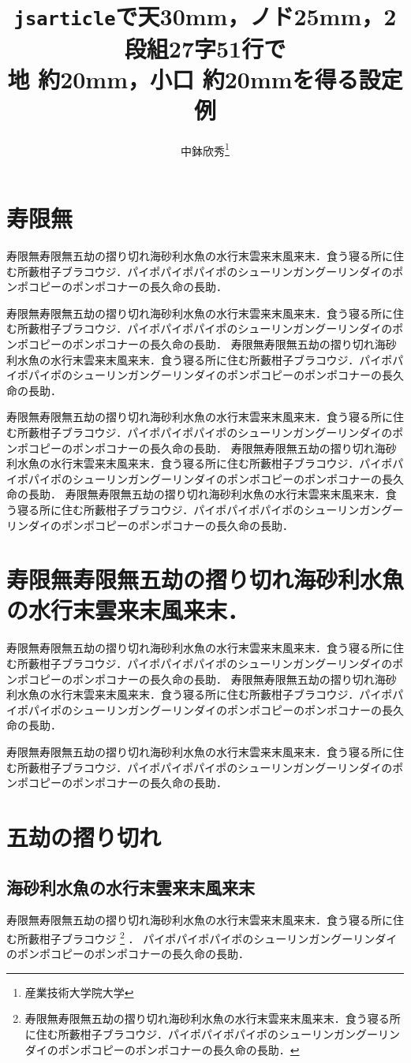 \documentclass[a4j, 9pt, twocolumn, twoside]{jsarticle}
\title{\texttt{jsarticle}で天30mm，ノド25mm，2段組27字51行で\\地 約20mm，小口 約20mmを得る設定例}
\author{中鉢欣秀\thanks{産業技術大学院大学}}
\begin{document}
\maketitle
\section{寿限無}
寿限無寿限無五劫の摺り切れ海砂利水魚の水行末雲来末風来末．食う寝る所に住む所藪柑子ブラコウジ．パイポパイポパイポのシューリンガングーリンダイのポンポコピーのポンポコナーの長久命の長助．

寿限無寿限無五劫の摺り切れ海砂利水魚の水行末雲来末風来末．食う寝る所に住む所藪柑子ブラコウジ．パイポパイポパイポのシューリンガングーリンダイのポンポコピーのポンポコナーの長久命の長助．
寿限無寿限無五劫の摺り切れ海砂利水魚の水行末雲来末風来末．食う寝る所に住む所藪柑子ブラコウジ．パイポパイポパイポのシューリンガングーリンダイのポンポコピーのポンポコナーの長久命の長助．

寿限無寿限無五劫の摺り切れ海砂利水魚の水行末雲来末風来末．食う寝る所に住む所藪柑子ブラコウジ．パイポパイポパイポのシューリンガングーリンダイのポンポコピーのポンポコナーの長久命の長助．
寿限無寿限無五劫の摺り切れ海砂利水魚の水行末雲来末風来末．食う寝る所に住む所藪柑子ブラコウジ．パイポパイポパイポのシューリンガングーリンダイのポンポコピーのポンポコナーの長久命の長助．
寿限無寿限無五劫の摺り切れ海砂利水魚の水行末雲来末風来末．食う寝る所に住む所藪柑子ブラコウジ．パイポパイポパイポのシューリンガングーリンダイのポンポコピーのポンポコナーの長久命の長助．
\section{寿限無寿限無五劫の摺り切れ海砂利水魚の水行末雲来末風来末．}
寿限無寿限無五劫の摺り切れ海砂利水魚の水行末雲来末風来末．食う寝る所に住む所藪柑子ブラコウジ．パイポパイポパイポのシューリンガングーリンダイのポンポコピーのポンポコナーの長久命の長助．
寿限無寿限無五劫の摺り切れ海砂利水魚の水行末雲来末風来末．食う寝る所に住む所藪柑子ブラコウジ．パイポパイポパイポのシューリンガングーリンダイのポンポコピーのポンポコナーの長久命の長助．

寿限無寿限無五劫の摺り切れ海砂利水魚の水行末雲来末風来末．食う寝る所に住む所藪柑子ブラコウジ．パイポパイポパイポのシューリンガングーリンダイのポンポコピーのポンポコナーの長久命の長助．
\section{五劫の摺り切れ}
\subsection{海砂利水魚の水行末雲来末風来末}
寿限無寿限無五劫の摺り切れ海砂利水魚の水行末雲来末風来末．食う寝る所に住む所藪柑子ブラコウジ
\footnote{寿限無寿限無五劫の摺り切れ海砂利水魚の水行末雲来末風来末．食う寝る所に住む所藪柑子ブラコウジ．パイポパイポパイポのシューリンガングーリンダイのポンポコピーのポンポコナーの長久命の長助．}
．
パイポパイポパイポのシューリンガングーリンダイのポンポコピーのポンポコナーの長久命の長助．
\end{document}

